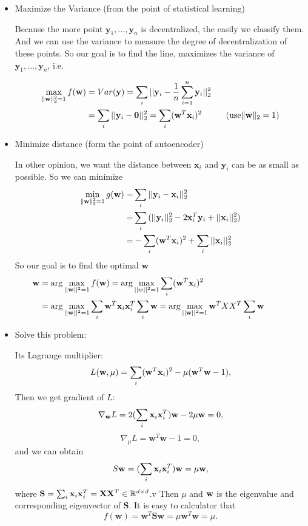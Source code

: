 \begin{itemize}
\item Maximize the Variance (from the point of statistical learning)	

	Because the more point $\mathbf y_1,...,\mathbf y_n$ is decentralized, the easily we classify them. And we can use the variance to measure the degree of decentralization of these points. So our goal is to find the line, maximizes the variance of  $\mathbf y_1,...,\mathbf y_n$, i.e.

	\begin{align*}
	\max_{\|\mathbf w\|^2_2=1}f(\textbf w)
	&=Var(\textbf y) = \sum_i \mathbf ||\mathbf y_i-\dfrac{1}{n}\sum_{i=1}^{n}\mathbf y_i||_2^2\\
	&= \sum_i \mathbf ||\mathbf y_i-\mathbf 0||_2^2= \sum_i(\textbf w^T \textbf x_i)^2 \hspace{1cm} (\text{use} \|\mathbf w\|_2=1)
	\end{align*}

\item Minimize distance (form the point of autoencoder)

	In other opinion, we want the distance between $\mathbf x_i$ and $\mathbf y_i$ can be as small as possible. So we can minimize 
	\begin{align*}
	\min_{\|\mathbf w\|^2_2=1}g(\textbf w)
	=&\sum_i \mathbf ||\mathbf y_i-\mathbf x_i||_2^2\\
	=&\sum_i \mathbf( ||\mathbf y_i||_2^2-2\mathbf x_i^T\mathbf y_i + ||\mathbf x_i||_2^2)\\
	=&-\sum_i(\textbf w^T \textbf x_i)^2+\sum_i||\mathbf x_i||_2^2
	\end{align*}
	So our goal is to find the optimal $\mathbf w$ 
	\begin{align}
	\mathbf w&=\arg\max_{||\mathbf w||^2=1} f(\mathbf w)=\arg\max_{||w||^2=1} \sum_i(\textbf w^T \textbf x_i)^2 \\\notag
	&= \arg\max_{||\mathbf w||^2=1} \sum_i\textbf w^T \textbf x_i \textbf x_i^T  \sum_i\textbf w 
	= \arg\max_{||\mathbf w||^2=1} \textbf w^T XX^T  \sum_i\textbf w   \hspace{1cm}
	\end{align}

\item Solve this problem:

	Its Lagrange multiplier: $$L(\textbf w,\mu )=\sum_i(\textbf w^T \textbf x_i)^2-\mu(\textbf w^T \textbf w-1),$$
	Then we get gradient of $L$:
	$$\nabla_{\mathbf w} L=2(\sum_i \textbf x_i \textbf x_i^T)\mathbf w-2\mu  \mathbf w=0,$$
	$$\nabla_{\mu} L=\mathbf w^T \mathbf w-1=0,$$
	and we can obtain $$S\mathbf w=(\sum_i \textbf x_i \textbf x_i^T)\textbf w=\mu \mathbf w,$$
	where $\textbf S=\sum_i \textbf x_i \textbf x_i^T=\mathbf X\mathbf X^T \in \mathbb{R}^{d\times d}$.v Then $\mu$ and $\textbf w$ is the eigenvalue and corresponding eigenvector of $\mathbf S$. It is easy to calculator that
	 $$f(\mathbf w)=\mathbf w^T \mathbf S \mathbf w =\mu \mathbf w^T\mathbf w =\mu.$$
\end{itemize}	 
